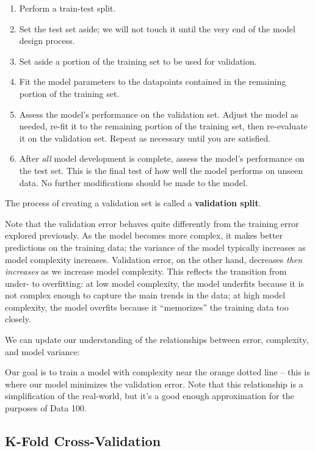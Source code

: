 \documentclass[
  letterpaper,
  DIV=11,
  numbers=noendperiod]{scrreprt}
\providecommand{\tightlist}{%
  \setlength{\itemsep}{0pt}\setlength{\parskip}{0pt}}\usepackage{longtable,booktabs,array}
\begin{document}
\begin{enumerate}
\def\labelenumi{\arabic{enumi}.}
\tightlist
\item
  Perform a train-test split.
\item
  Set the test set aside; we will not touch it until the very end of the
  model design process.
\item
  Set aside a portion of the training set to be used for validation.
\item
  Fit the model parameters to the datapoints contained in the remaining
  portion of the training set.
\item
  Assess the model's performance on the validation set. Adjust the model
  as needed, re-fit it to the remaining portion of the training set,
  then re-evaluate it on the validation set. Repeat as necessary until
  you are satisfied.
\item
  After \emph{all} model development is complete, assess the model's
  performance on the test set. This is the final test of how well the
  model performs on unseen data. No further modifications should be made
  to the model.
\end{enumerate}

The process of creating a validation set is called a \textbf{validation
split}.

Note that the validation error behaves quite differently from the
training error explored previously. As the model becomes more complex,
it makes better predictions on the training data; the variance of the
model typically increases as model complexity increases. Validation
error, on the other hand, decreases \emph{then increases} as we increase
model complexity. This reflects the transition from under- to
overfitting: at low model complexity, the model underfits because it is
not complex enough to capture the main trends in the data; at high model
complexity, the model overfits because it ``memorizes'' the training
data too closely.

We can update our understanding of the relationships between error,
complexity, and model variance:

Our goal is to train a model with complexity near the orange dotted line
-- this is where our model minimizes the validation error. Note that
this relationship is a simplification of the real-world, but it's a good
enough approximation for the purposes of Data 100.

\subsection{K-Fold Cross-Validation}\label{k-fold-cross-validation}
\end{document}
